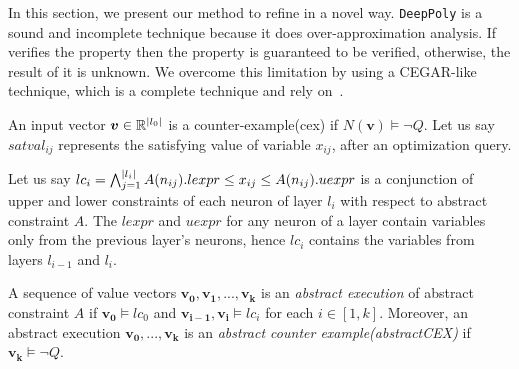 In this section, we present our method to refine \deeppoly in a novel way.
%
\texttt{DeepPoly} is a sound and incomplete technique because it does over-approximation analysis. 
If \deeppoly{} verifies the property then the property is guaranteed to be verified, otherwise, the result of it is unknown. 
We overcome this limitation by using a CEGAR-like technique, which is a complete technique
and rely on~\deeppoly{}. 



An input vector $\boldsymbol{v} \in \mathbb{R}^{|l_0|}$ is a counter-example(cex) if $N(\boldsymbol{v}) \models \lnot Q$. 
Let us say $satval_{ij}$ represents the satisfying value of variable $x_{ij}$, after an optimization query. 







Let us say $lc_i = \bigwedge_{j=1}^{|l_i|} A(n_{ij}).lexpr \leq x_{ij} \leq  A(n_{ij}).uexpr$ is a 
conjunction of upper and lower constraints of each neuron of layer $l_i$ with respect to abstract constraint $A$.
The $lexpr$ and $uexpr$ for any neuron of a layer contain variables only from the previous layer's neurons, 
hence $lc_i$ contains the variables from layers $l_{i-1}$ and $l_i$. 

\begin{df}
  A sequence of value vectors $\boldsymbol{v_0}, \boldsymbol{v_1}, ... , \boldsymbol{v_k}$ is an 
  {\em abstract execution} of abstract constraint $A$ if 
  $\boldsymbol{v_0} \models lc_0$ and $\boldsymbol{v_{i-1}}, \boldsymbol{v_i} \models lc_i$ for each $i \in [1,k]$.  
 Moreover, an abstract execution $\boldsymbol{v_0,...,v_k}$ is
 an {\em abstract counter example(abstractCEX)} if $\boldsymbol{v_k} \models \lnot Q$.
\end{df}



